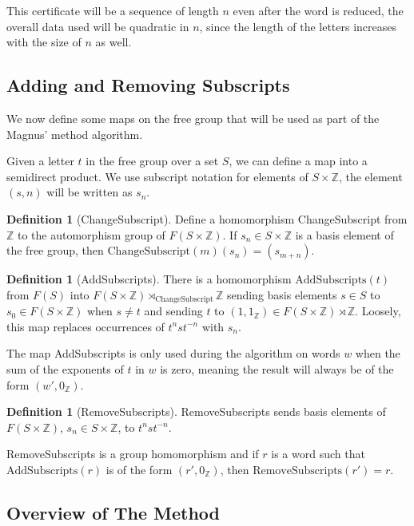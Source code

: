 \documentclass[12pt]{article} %
\theoremstyle{definition}
\theoremstyle{definition}
\theoremstyle{definition}
\theoremstyle{definition}
\newtheorem{defn}[thm]{Definition}
\begin{document}
This certificate will be a sequence of length $n$ even after the word is reduced,
the overall data used will be quadratic in $n$, since the length of the letters
increases with the size of $n$ as well.

\subsection{Adding and Removing Subscripts}

We now define some maps on the free group that will be used as part of the Magnus'
method algorithm.

Given a letter $t$ in the free group over a set $S$, we can define a map into a
semidirect product. We use subscript notation for elements of $S \times \mathbb{Z}$,
the element $(s, n)$ will be written as $s_n$.

\begin{defn}[ChangeSubscript]\label{csub}
  Define a homomorphism ChangeSubscript from $\mathbb{Z}$ to the automorphism
  group of $F(S \times \mathbb{Z})$. If $s_n \in S \times \mathbb{Z}$ is a basis
  element of the free group, then $\text{ChangeSubscript}(m)(s_n) = (s_{m+n})$.
\end{defn}

\begin{defn}[AddSubscripts]\label{AddSubscripts}
  There is a homomorphism $\text{AddSubscripts}(t)$ from $F(S)$ into $F(S \times \mathbb{Z})
  \rtimes_{\text{ChangeSubscript}} \mathbb{Z}$ sending basis elements $s \in S$ to
  $s_0 \in F(S \times \mathbb{Z})$ when $s \ne t$ and sending $t$ to
  $(1, 1_\mathbb{Z}) \in F(S \times \mathbb{Z}) \rtimes \mathbb{Z}$. Loosely, this map
  replaces occurrences of $t^n s t^{-n}$ with $s_n$.
\end{defn}

The map AddSubscripts is only used during the algorithm on words $w$ when the sum of the
exponents of $t$ in $w$ is zero, meaning the result will always be of the form
$(w', 0_{\mathbb{Z}})$.

\begin{defn}[RemoveSubscripts]
  RemoveSubscripts sends basis elements of $F(S\times \mathbb{Z})$,  $s_n \in S\times \mathbb{Z}$,
  to $t^n s t^{-n}$.
\end{defn}
RemoveSubscripts is a group homomorphism and if $r$ is a word such that
$\text{AddSubscripts}(r)$ is of the form $(r', 0_\mathbb{Z})$,
then $\text{RemoveSubscripts}(r') = r$.

\subsection{Overview of The Method}
\end{document}
